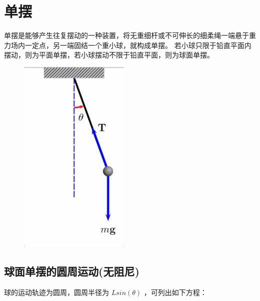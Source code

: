 \documentclass[12pt,a4paper]{ctexart}
\begin{document}
	
	
	
	
	
	
	
	
	\section{单摆}
		单摆是能够产生往复摆动的一种装置，将无重细杆或不可伸长的细柔绳一端悬于重力场内一定点，另一端固结一个重小球，就构成单摆。
		若小球只限于铅直平面内摆动，则为平面单摆，若小球摆动不限于铅直平面，则为球面单摆。
		
		
	\hfill
	
	
	\begin{figure}[h] %
		\centering %
		\includegraphics[height=8\baselineskip]{T41.PNG} %
	\end{figure}%


	\subsection{球面单摆的圆周运动(无阻尼)}
		球的运动轨迹为圆周，圆周半径为  $L sin(\theta)$          ，可列出如下方程：
		
\end{document}

